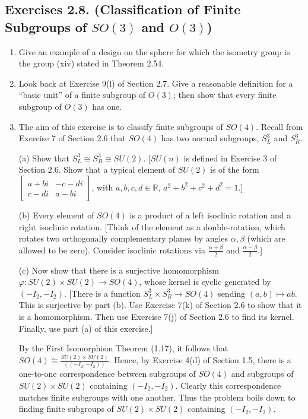 \documentclass[leqno]{book}
\begin{document}
\subsection*{Exercises 2.8. (Classification of Finite Subgroups of $SO(3)$ and $O(3)$)}
\begin{enumerate}
\item Give an example of a design on the sphere for which the isometry group is the group (xiv) stated in Theorem 2.54.

\item Look back at Exercise 9(l) of Section 2.7.  Give a reasonable definition for a ``basic unit'' of a finite subgroup of $O(3)$; then show that every finite subgroup of $O(3)$ has one.

\item The aim of this exercise is to classify finite subgroups of $SO(4)$.  Recall from Exercise 7 of Section 2.6 that $SO(4)$ has two normal subgroups, $S^3_L$ and $S^3_R$.

(a) Show that $S^3_L\cong S^3_R\cong SU(2)$.  [$SU(n)$ is defined in Exercise 3 of Section 2.6.  Show that a typical element of $SU(2)$ is of the form $\begin{bmatrix}a+bi&-c-di\\c-di&a-bi\end{bmatrix}$, with $a,b,c,d\in\mathbb R$, $a^2+b^2+c^2+d^2=1$.]

(b) Every element of $SO(4)$ is a product of a left isoclinic rotation and a right isoclinic rotation.  [Think of the element as a double-rotation, which rotates two orthogonally complementary planes by angles $\alpha,\beta$ (which are allowed to be zero).  Consider isoclinic rotations via $\frac{\alpha+\beta}2$ and $\frac{\alpha-\beta}2$.]

(c) Now show that there is a surjective homomorphism $\varphi:SU(2)\times SU(2)\to SO(4)$, whose kernel is cyclic generated by $(-I_2,-I_2)$.  [There is a function $S^3_L\times S^3_R\to SO(4)$ sending $(a,b)\mapsto ab$.  This is surjective by part (b).  Use Exercise 7(k) of Section 2.6 to show that it is a homomorphism.  Then use Exercise 7(j) of Section 2.6 to find its kernel.  Finally, use part (a) of this exercise.]

By the First Isomorphism Theorem (1.17), it follows that $SO(4)\cong\frac{SU(2)\times SU(2)}{\left<(-I_2,-I_2)\right>}$.  Hence, by Exercise 4(d) of Section 1.5, there is a one-to-one correspondence between subgroups of $SO(4)$ and subgroups of $SU(2)\times SU(2)$ containing $(-I_2,-I_2)$.  Clearly this correspondence matches finite subgroups with one another.  Thus the problem boils down to finding finite subgroups of $SU(2)\times SU(2)$ containing $(-I_2,-I_2)$.


\end{enumerate}
\end{document}
